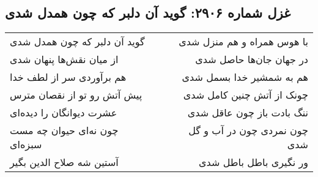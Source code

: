\begin{center}
\section*{غزل شماره ۲۹۰۶: گوید آن دلبر که چون همدل شدی}
\label{sec:2906}
\begin{longtable}{l p{0.5cm} r}
گوید آن دلبر که چون همدل شدی
&&
با هوس همراه و هم منزل شدی
\\
از میان نقش‌ها پنهان شدی
&&
در جهان جان‌ها حاصل شدی
\\
هم برآوردی سر از لطف خدا
&&
هم به شمشیر خدا بسمل شدی
\\
پیش آتش رو تو از نقصان مترس
&&
چونک از آتش چنین کامل شدی
\\
عشرت دیوانگان را دیده‌ای
&&
ننگ بادت باز چون عاقل شدی
\\
چون نه‌ای حیوان چه مست سبزه‌ای
&&
چون نمردی چون در آب و گل شدی
\\
آستین شه صلاح الدین بگیر
&&
ور نگیری باطل باطل شدی
\\
\end{longtable}
\end{center}
